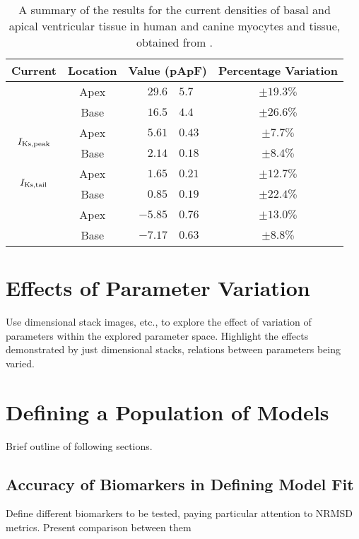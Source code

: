 \documentclass[../thesis-main.tex]{subfiles}
\begin{document}
 \begin{table}
  \centering
  \begin{tabular}{ccr@{$\pm$}lc}
   Current					& Location	& \multicolumn{2}{c}{Value (pApF\super{-1})}	& Percentage Variation	\\
   \hline
   \hline
   \multirow{2}{*}{\ito{}}			& Apex		& $29.6$&$5.7$					& $\pm19.3\%$		\\
						& Base		& $16.5$&$4.4$					& $\pm26.6\%$		\\
   \hline
   \multirow{2}{*}{$I_\textnormal{Ks,peak}$}	& Apex		& $5.61$&$0.43$					& $\pm7.7\%$		\\
						& Base		& $2.14$&$0.18$					& $\pm8.4\%$		\\
   \multirow{2}{*}{$I_\textnormal{Ks,tail}$}	& Apex		& $1.65$&$0.21$					& $\pm12.7\%$		\\
						& Base		& $0.85$&$0.19$					& $\pm22.4\%$		\\
   \hline
   \multirow{2}{*}{\ica{}}			& Apex		& $-5.85$&$0.76$				& $\pm13.0\%$		\\
						& Base		& $-7.17$&$0.63$				& $\pm8.8\%$		\\
  \end{tabular}
  \caption[Summary of current density results from \citet{Szentadrassy2005}.]{A summary of the results for the current densities of basal and apical ventricular tissue in human and canine myocytes and tissue, obtained from \citet{Szentadrassy2005}.}
  \label{table:szentadrassy-results}
 \end{table}
 
 \section{Effects of Parameter Variation}
 \label{sec:param-effects}
 Use dimensional stack images, etc., to explore the effect of variation of parameters within the explored parameter space. Highlight the effects demonstrated by just dimensional stacks, \eg{} relations between parameters being varied.
 
 \section{Defining a Population of Models}
 \label{sec:population}
 Brief outline of following sections.
 
 \subsection{Accuracy of Biomarkers in Defining Model Fit}
 \label{subsec:model-fit}
 Define different biomarkers to be tested, paying particular attention to NRMSD metrics. Present comparison between them
 
\end{document}
